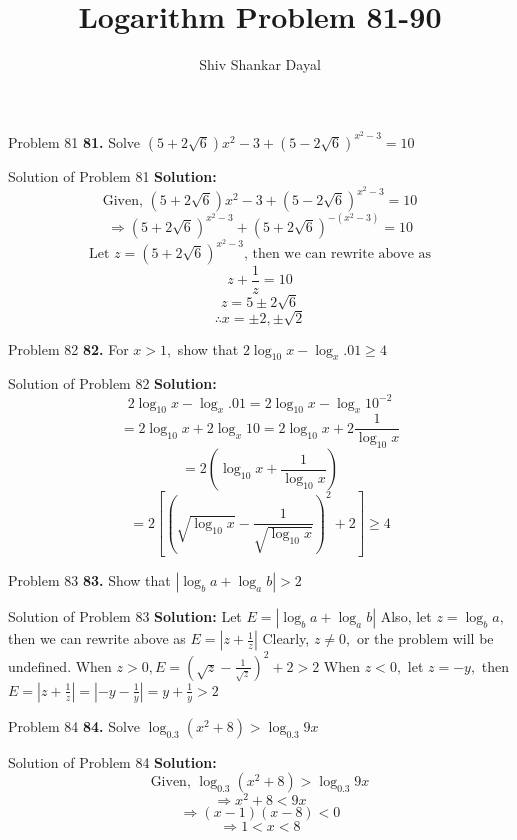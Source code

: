 \documentclass[aspectratio=1610,8pt]{beamer}
\title{Logarithm Problem 81-90}
\author[Shiv Shankar Dayal]{Shiv Shankar Dayal}
\begin{document}
\begin{frame}
  \titlepage
\end{frame}
\begin{frame}{Problem 81}
  \textbf{81.} Solve $(5 + 2\sqrt{6}){x^2 - 3} + (5 - 2\sqrt{6})^{x^2 - 3} = 10$
\end{frame}
\begin{frame}{Solution of Problem 81}
  \textbf{Solution:} $$\text{Given,~}(5 + 2\sqrt{6}){x^2 - 3} + (5 - 2\sqrt{6})^{x^2 - 3} = 10$$
  $$\Rightarrow (5 + 2\sqrt{6})^{x^2 - 3} + (5 + 2\sqrt{6})^{-(x^2 - 3)} = 10$$
  $$\text{Let~}z = (5 + 2\sqrt{6})^{x^2 - 3}\text{,~then we can rewrite above as}$$
  $$z + \frac{1}{z} = 10$$
  $$z = 5 \pm 2\sqrt{6}$$
  $$\therefore x = \pm2, \pm\sqrt{2}$$
\end{frame}
\begin{frame}{Problem 82}
  \textbf{82.} For $x > 1,$ show that $2\log_{10}x - \log_x.01\geq 4$
\end{frame}
\begin{frame}{Solution of Problem 82}
  \textbf{Solution:} $$2\log_{10}x - \log_x.01 = 2\log_{10}x - \log_x10^{-2}$$
  $$= 2\log_{10}x + 2\log_x10 = 2\log_{10}x + 2\frac{1}{\log_{10}x}$$
  $$= 2\left(\log_{10}x + \frac{1}{\log_{10}x}\right)$$
  $$= 2\left[\left(\sqrt{\log_{10}x} - \frac{1}{\sqrt{\log_{10}x}}\right)^2 + 2\right] \geq 4$$
\end{frame}
\begin{frame}{Problem 83}
  \textbf{83.} Show that $|\log_ba + \log_ab| > 2$
\end{frame}
\begin{frame}{Solution of Problem 83}
  \textbf{Solution:} Let $E = |\log_ba + \log_ab|$
  \linebreak\linebreak
  Also, let $z = \log_ba,$ then we can rewrite above as $E = \left|z + \frac{1}{z}\right|$
  \linebreak\linebreak
  Clearly, $z\neq 0,$ or the problem will be undefined. When $z > 0, E = \left(\sqrt{z} - \frac{1}{\sqrt{z}}\right)^2 + 2 > 2$
  \linebreak\linebreak
  When $z < 0,$ let $z = -y,$ then $E = \left|z + \frac{1}{z}\right| = \left|-y - \frac{1}{y}\right| = y + \frac{1}{y} > 2$
\end{frame}
\begin{frame}{Problem 84}
  \textbf{84.} Solve $\log_{0.3}(x^2 + 8) > \log_{0.3}9x$
\end{frame}
\begin{frame}{Solution of Problem 84}
  \textbf{Solution:} $$\text{Given,~}\log_{0.3}(x^2 + 8) > \log_{0.3}9x$$
  $$\Rightarrow x^2 + 8 < 9x$$
  $$\Rightarrow (x - 1)(x - 8) < 0$$
  $$\Rightarrow 1 < x < 8$$
\end{frame}
\end{document}

